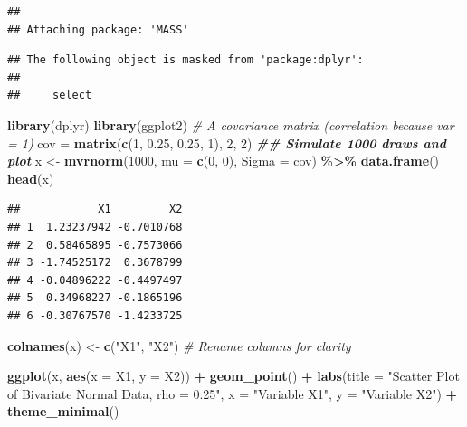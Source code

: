 \documentclass[
]{book}
\newenvironment{Shaded}{\begin{snugshade}}{\end{snugshade}}
\newcommand{\AttributeTok}[1]{\textcolor[rgb]{0.13,0.29,0.53}{#1}}
\newcommand{\CommentTok}[1]{\textcolor[rgb]{0.56,0.35,0.01}{\textit{#1}}}
\newcommand{\DecValTok}[1]{\textcolor[rgb]{0.00,0.00,0.81}{#1}}
\newcommand{\DocumentationTok}[1]{\textcolor[rgb]{0.56,0.35,0.01}{\textbf{\textit{#1}}}}
\newcommand{\FloatTok}[1]{\textcolor[rgb]{0.00,0.00,0.81}{#1}}
\newcommand{\FunctionTok}[1]{\textcolor[rgb]{0.13,0.29,0.53}{\textbf{#1}}}
\newcommand{\NormalTok}[1]{#1}
\newcommand{\OtherTok}[1]{\textcolor[rgb]{0.56,0.35,0.01}{#1}}
\newcommand{\SpecialCharTok}[1]{\textcolor[rgb]{0.81,0.36,0.00}{\textbf{#1}}}
\newcommand{\StringTok}[1]{\textcolor[rgb]{0.31,0.60,0.02}{#1}}
\begin{document}
\begin{verbatim}
## 
## Attaching package: 'MASS'
\end{verbatim}

\begin{verbatim}
## The following object is masked from 'package:dplyr':
## 
##     select
\end{verbatim}

\begin{Shaded}
\begin{Highlighting}[]
\FunctionTok{library}\NormalTok{(dplyr)}
\FunctionTok{library}\NormalTok{(ggplot2)}
\CommentTok{\# A covariance matrix (correlation because var = 1)}
\NormalTok{cov }\OtherTok{=} \FunctionTok{matrix}\NormalTok{(}\FunctionTok{c}\NormalTok{(}\DecValTok{1}\NormalTok{, }\FloatTok{0.25}\NormalTok{, }\FloatTok{0.25}\NormalTok{, }\DecValTok{1}\NormalTok{), }\DecValTok{2}\NormalTok{, }\DecValTok{2}\NormalTok{)}
\DocumentationTok{\#\# Simulate 1000 draws and plot}
\NormalTok{x }\OtherTok{\textless{}{-}} \FunctionTok{mvrnorm}\NormalTok{(}\DecValTok{1000}\NormalTok{, }\AttributeTok{mu =} \FunctionTok{c}\NormalTok{(}\DecValTok{0}\NormalTok{, }\DecValTok{0}\NormalTok{), }\AttributeTok{Sigma =}\NormalTok{ cov) }\SpecialCharTok{\%\textgreater{}\%} \FunctionTok{data.frame}\NormalTok{()}
\FunctionTok{head}\NormalTok{(x)}
\end{Highlighting}
\end{Shaded}

\begin{verbatim}
##            X1         X2
## 1  1.23237942 -0.7010768
## 2  0.58465895 -0.7573066
## 3 -1.74525172  0.3678799
## 4 -0.04896222 -0.4497497
## 5  0.34968227 -0.1865196
## 6 -0.30767570 -1.4233725
\end{verbatim}

\begin{Shaded}
\begin{Highlighting}[]
\FunctionTok{colnames}\NormalTok{(x) }\OtherTok{\textless{}{-}} \FunctionTok{c}\NormalTok{(}\StringTok{"X1"}\NormalTok{, }\StringTok{"X2"}\NormalTok{)  }\CommentTok{\# Rename columns for clarity}

\FunctionTok{ggplot}\NormalTok{(x, }\FunctionTok{aes}\NormalTok{(}\AttributeTok{x =}\NormalTok{ X1, }\AttributeTok{y =}\NormalTok{ X2)) }\SpecialCharTok{+}
  \FunctionTok{geom\_point}\NormalTok{() }\SpecialCharTok{+}  
  \FunctionTok{labs}\NormalTok{(}\AttributeTok{title =} \StringTok{"Scatter Plot of Bivariate Normal Data, rho = 0.25"}\NormalTok{,}
       \AttributeTok{x =} \StringTok{"Variable X1"}\NormalTok{,}
       \AttributeTok{y =} \StringTok{"Variable X2"}\NormalTok{) }\SpecialCharTok{+}
  \FunctionTok{theme\_minimal}\NormalTok{()  }
\end{Highlighting}
\end{Shaded}
\end{document}
